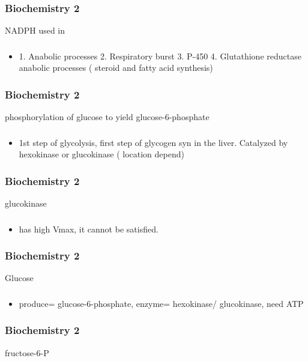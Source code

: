 \documentclass[11pt]{beamer}
\begin{document}
\begin{frame}
 \frametitle{Biochemistry 2}
NADPH used in 
\end{frame}

\begin{frame}
 \frametitle{}
\begin{itemize}
\item 1. Anabolic processes 2. Respiratory burst 3. P-450 4. Glutathione reductase  \\ anabolic processes ( steroid and fatty acid synthesis) 
\end{itemize}
\end{frame}

\begin{frame}
 \frametitle{Biochemistry 2}
phosphorylation of glucose to yield glucose-6-phosphate 
\end{frame}

\begin{frame}
 \frametitle{}
\begin{itemize}
\item 1st step of glycolysis, first step of glycogen syn in the liver. Catalyzed by hexokinase or glucokinase ( location depend) 
\end{itemize}
\end{frame}

\begin{frame}
 \frametitle{Biochemistry 2}
glucokinase 
\end{frame}

\begin{frame}
 \frametitle{}
\begin{itemize}
\item has high Vmax, it cannot be satisfied. 
\end{itemize}
\end{frame}

\begin{frame}
 \frametitle{Biochemistry 2}
Glucose 
\end{frame}

\begin{frame}
 \frametitle{}
\begin{itemize}
\item produce= glucose-6-phosphate, enzyme= hexokinase/ glucokinase, need ATP 
\end{itemize}
\end{frame}

\begin{frame}
 \frametitle{Biochemistry 2}
fructose-6-P
\end{frame}
\end{document}
